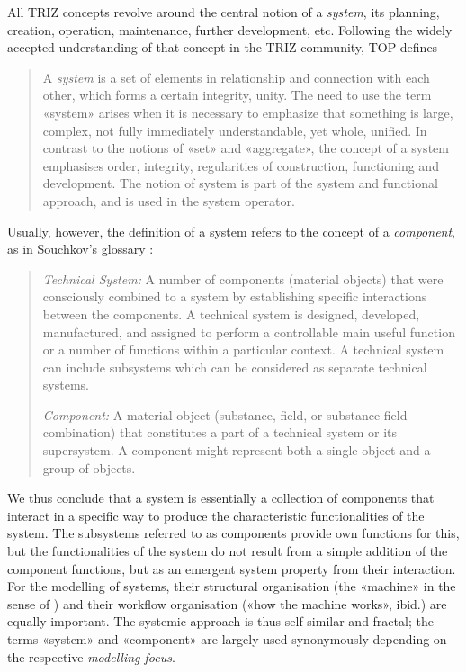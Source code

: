 \documentclass[11pt,a4paper]{article}
\begin{document}
All TRIZ concepts revolve around the central notion of a \emph{system}, its
planning, creation, operation, maintenance, further development, etc.
Following the widely accepted understanding of that concept in the TRIZ
community, TOP defines
\begin{quote}
  A \emph{system} is a set of elements in relationship and connection with
  each other, which forms a certain integrity, unity. The need to use the term
  «system» arises when it is necessary to emphasize that something is large,
  complex, not fully immediately understandable, yet whole, unified. In
  contrast to the notions of «set» and «aggregate», the concept of a system
  emphasises order, integrity, regularities of construction, functioning and
  development. The notion of system is part of the system and functional
  approach, and is used in the system operator.
\end{quote}
Usually, however, the definition of a system refers to the concept of a
\emph{component}, as in Souchkov's glossary \cite{Souchkov2018}:
\begin{quote}
  \emph{Technical System:} A number of components (material objects) that were
  consciously combined to a system by establishing specific interactions
  between the components. A technical system is designed, developed,
  manufactured, and assigned to perform a controllable main useful function or
  a number of functions within a particular context. A technical system can
  include subsystems which can be considered as separate technical systems.

  \emph{Component:} A material object (substance, field, or substance-field
  combination) that constitutes a part of a technical system or its
  supersystem.  A component might represent both a single object and a group
  of objects.
\end{quote}
We thus conclude that a system is essentially a collection of components that
interact in a specific way to produce the characteristic functionalities of
the system.  The subsystems referred to as components provide own functions
for this, but the functionalities of the system do not result from a simple
addition of the component functions, but as an emergent system property from
their interaction. For the modelling of systems, their structural organisation
(the «machine» in the sense of \cite{TT}) and their workflow organisation
(«how the machine works», ibid.)  are equally important.  The systemic
approach is thus self-similar and fractal; the terms «system» and «component»
are largely used synonymously depending on the respective \emph{modelling
  focus}.
\end{document}
